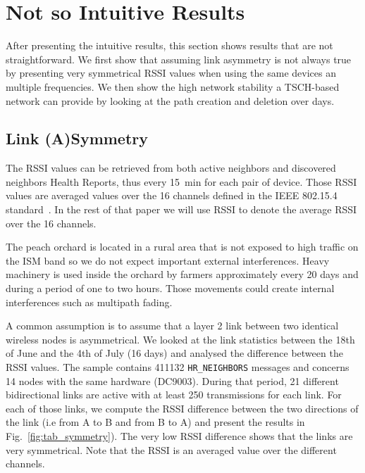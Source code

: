 \documentclass{sig-alternate}
\newcommand{\HRNEIGHBORS}         {{\tt HR\_NEIGHBORS}\xspace}
\begin{document}
\section{Not so Intuitive Results}
\label{sec:notsointuitive}

After presenting the intuitive results, this section shows results that are not straightforward.
We first show that assuming link asymmetry is not always true by presenting very symmetrical RSSI values when using the same devices an multiple frequencies.
We then show the high network stability a TSCH-based network can provide by looking at the path creation and deletion over days.

\subsection{Link (A)Symmetry}
\label{sec:symmetry}


The RSSI values can be retrieved from both active neighbors and discovered neighbors Health Reports, thus every 15~min for each pair of device.
Those RSSI values are averaged values over the 16 channels defined in the IEEE 802.15.4 standard~\cite{std_ieee802154_2011}.
In the rest of that paper we will use RSSI to denote the average RSSI over the 16 channels.


The peach orchard is located in a rural area that is not exposed to high traffic on the ISM band so we do not expect important external interferences.
Heavy machinery is used inside the orchard by farmers approximately every 20 days and during a period of one to two hours.
Those movements could create internal interferences such as multipath fading.


A common assumption is to assume that a layer 2 link between two identical wireless nodes is asymmetrical.
We looked at the link statistics between the 18th of June and the 4th of July (16 days) and analysed the difference between the RSSI values.
The sample contains 411132 \HRNEIGHBORS messages and concerns 14 nodes with the same hardware (DC9003).
During that period, 21 different bidirectional links are active with at least 250 transmissions for each link.
For each of those links, we compute the RSSI difference between the two directions of the link (i.e from A to B and from B to A) and present the results in Fig.~\ref{fig:tab_symmetry}).
The very low RSSI difference shows that the links are very symmetrical.
Note that the RSSI is an averaged value over the different channels.
\end{document}
